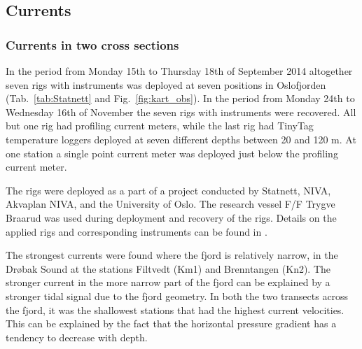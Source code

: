 
\subsection{Currents}

\subsubsection{Currents in two cross sections}
In the period from Monday 15th to Thursday 18th of September 2014 altogether seven rigs with instruments was deployed at seven positions in Oslofjorden (Tab.~\ref{tab:Statnett} and Fig.~\ref{fig:kart_obs}). In the period from Monday 24th to Wednesday 16th of November the seven rigs with instruments were recovered. All but one rig had profiling current meters, while the last rig had TinyTag temperature loggers deployed at seven different depths between 20 and 120 m. At one station a single point current meter was deployed just below the profiling current meter. 

The rigs were deployed as a part of a project conducted by Statnett, NIVA, Akvaplan NIVA, and the University of Oslo. The research vessel F/F Trygve Braarud was used during deployment and recovery of the rigs. Details on the applied rigs and corresponding instruments can be found in \cite{staalstrom:2015}.

The strongest currents were found where the fjord is relatively narrow, in the Dr{\o}bak Sound at the stations Filtvedt (Km1) and Brenntangen (Kn2). The stronger current in the more narrow part of the fjord can be explained by a stronger tidal signal due to the fjord geometry. In both the two transects across the fjord, it was the shallowest stations that had the highest current velocities. This can be explained by the fact that the horizontal pressure gradient has a tendency to decrease with depth.

